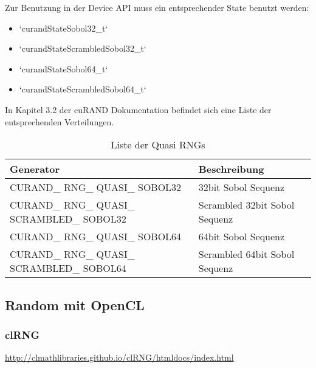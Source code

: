             Zur Benutzung in der Device \Gls{API} muss ein entsprechender State benutzt werden:
            \begin{itemize}
                \item \li`curandStateSobol32_t`
                \item \li`curandStateScrambledSobol32_t`
                \item \li`curandStateSobol64_t`
                \item \li`curandStateScrambledSobol64_t`
            \end{itemize}
			
            In Kapitel 3.2 der cuRAND Dokumentation befindet sich eine Liste der entsprechenden Verteilungen. \autocite{curandDoc}
            
            \begin{table}[h]
                \centering
                \begin{tabular}{ll}
                    \toprule
                    \textbf{Generator} & \textbf{Beschreibung} \\ \midrule
                    CURAND\_ RNG\_ QUASI\_ SOBOL32     & 32bit Sobol Sequenz \\
                    CURAND\_ RNG\_ QUASI\_ SCRAMBLED\_ SOBOL32 & Scrambled 32bit Sobol Sequenz \\
                    CURAND\_ RNG\_ QUASI\_ SOBOL64 & 64bit Sobol Sequenz \\
                    CURAND\_ RNG\_ QUASI\_ SCRAMBLED\_ SOBOL64 & Scrambled 64bit Sobol Sequenz \\ \bottomrule
                \end{tabular}
                \caption{Liste der Quasi RNGs}
                \label{tab5:qrng}
            \end{table}				
						
        \subsection{Random mit OpenCL}
            \subsubsection{clRNG}
            \url{http://clmathlibraries.github.io/clRNG/htmldocs/index.html}
			
